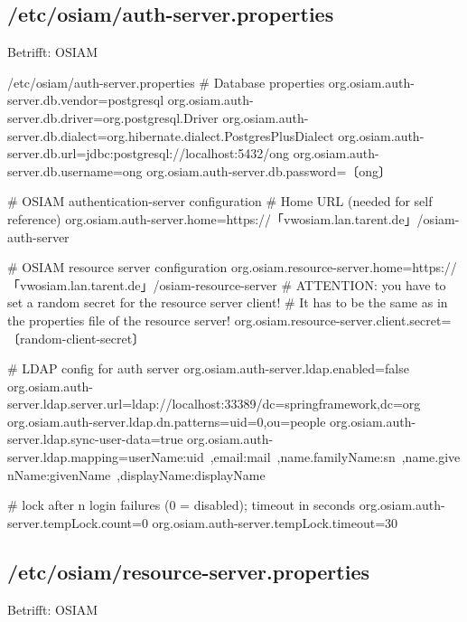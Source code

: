\fi%
\ifoa

\subsection{/etc/osiam/auth-server.properties}\label{subsec:refcfg-osiam-auth}

Betrifft: OSIAM

\begin{lstdump}{/etc/osiam/auth-server.properties}
# Database properties
org.osiam.auth-server.db.vendor=postgresql
org.osiam.auth-server.db.driver=org.postgresql.Driver
org.osiam.auth-server.db.dialect=org.hibernate.dialect.PostgresPlusDialect
org.osiam.auth-server.db.url=jdbc:postgresql://localhost:5432/ong
org.osiam.auth-server.db.username=ong
org.osiam.auth-server.db.password=〔ong〕

# OSIAM authentication-server configuration
# Home URL (needed for self reference)
org.osiam.auth-server.home=https://「vwosiam.lan.tarent.de」/osiam-auth-server

# OSIAM resource server configuration
org.osiam.resource-server.home=https://「vwosiam.lan.tarent.de」/osiam-resource-server
# ATTENTION: you have to set a random secret for the resource server client!
# It has to be the same as in the properties file of the resource server!
org.osiam.resource-server.client.secret=〔random-client-secret〕

# LDAP config for auth server
org.osiam.auth-server.ldap.enabled=false
org.osiam.auth-server.ldap.server.url=ldap://localhost:33389/dc=springframework,dc=org
org.osiam.auth-server.ldap.dn.patterns=uid={0},ou=people
org.osiam.auth-server.ldap.sync-user-data=true
org.osiam.auth-server.ldap.mapping=userName:uid\
,email:mail\
,name.familyName:sn\
,name.givenName:givenName\
,displayName:displayName\

# lock after n login failures (0 = disabled); timeout in seconds
org.osiam.auth-server.tempLock.count=0
org.osiam.auth-server.tempLock.timeout=30
\end{lstdump}

\subsection{/etc/osiam/resource-server.properties}\label{subsec:refcfg-osiam-rsrc}

Betrifft: OSIAM

